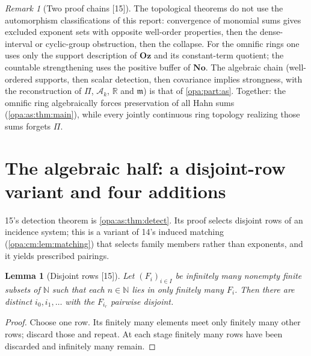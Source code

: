 \documentclass[11pt,oneside]{article}
\numberwithin{equation}{section}
\newtheorem{lemma}[lemma]{Lemma}
\theoremstyle{definition}
\theoremstyle{remark}
\newtheorem{remark}[remark]{Remark}
\newcommand{\No}{\mathbf{No}}
\newcommand{\Oz}{\mathbf{Oz}}
\newcommand{\R}{\mathbb R}
\newcommand{\N}{\mathbb N}
\newcommand{\Ak}{\mathcal A_k}
\newcommand{\mm}{\mathfrak m}
\newcommand{\src}[1]{\textup{\textsf{\small[#1]}}}
\begin{document}
\begin{remark}[Two proof chains \src{15}]\label{opa:tc:rem:chains}
The topological theorems do not use the automorphism classifications of this report: convergence of
monomial sums gives excluded exponent sets with opposite well-order properties, then the dense-interval or
cyclic-group obstruction, then the collapse. For the omnific rings one uses only the support description
of $\Oz$ and its constant-term quotient; the countable strengthening uses the positive buffer of $\No$.
The algebraic chain (well-ordered supports, then scalar detection, then covariance implies strongness,
with the reconstruction of $\Pi$, $\Ak$, $\R$ and $\mm$) is that of \cref{opa:part:as}. Together: the
omnific ring algebraically forces preservation of all Hahn sums (\cref{opa:as:thm:main}), while every
jointly continuous ring topology realizing those sums forgets $\Pi$.
\end{remark}

\section{The algebraic half: a disjoint-row variant and four additions}\label{opa:tc:sec:algebraic}

15's detection theorem is \cref{opa:as:thm:detect}. Its proof selects disjoint rows of an incidence
system; this is a variant of 14's induced matching (\cref{opa:cm:lem:matching}) that selects family
members rather than exponents, and it yields prescribed pairings.

\begin{lemma}[Disjoint rows \src{15}]\label{opa:tc:lem:disjoint}
Let $(F_i)_{i\in I}$ be infinitely many nonempty finite subsets of $\N$ such that each $n\in\N$ lies in only
finitely many $F_i$. Then there are distinct $i_0,i_1,\ldots$ with the $F_{i_r}$ pairwise disjoint.
\end{lemma}
\begin{proof}
Choose one row. Its finitely many elements meet only finitely many other rows; discard those and
repeat. At each stage finitely many rows have been discarded and infinitely many remain.
\end{proof}
\end{document}

